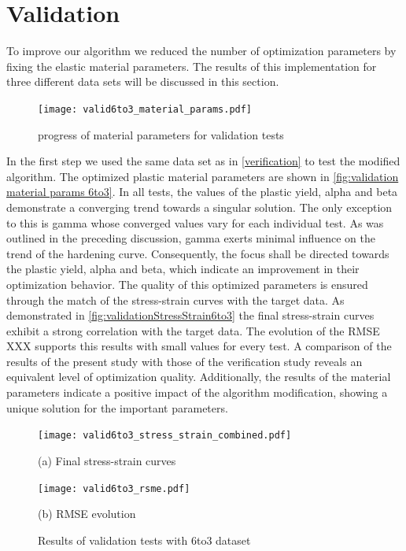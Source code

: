     
    \section{Validation}\label{sec: validation}
    To improve our algorithm we reduced the number of optimization parameters by fixing the elastic material parameters. The results of this implementation for three different data sets will be discussed in this section.

    \begin{figure}[H]
		\centering
        \texttt{[image: valid6to3\_material\_params.pdf]}
		\caption{progress of material parameters for validation tests}
		\label{fig:validation material params 6to3}
	\end{figure}

    In the first step we used the same data set as in \autoref{verification} to test the modified algorithm. The optimized plastic material parameters are shown in \autoref{fig:validation material params 6to3}.  In all tests, the values of the plastic yield, alpha and beta demonstrate a converging trend towards a singular solution. The only exception to this is gamma whose converged values vary for each individual test. As was outlined in the preceding discussion, gamma exerts minimal influence on the trend of the hardening curve. Consequently, the focus shall be directed towards the plastic yield, alpha and beta, which indicate an improvement in their optimization behavior.
    The quality of this optimized parameters is ensured through the match of the stress-strain curves with the target data. As demonstrated in \autoref{fig:validationStressStrain6to3} the final stress-strain curves exhibit a strong correlation with the target data. The evolution of the RMSE XXX supports this results with small values for every test. A comparison of the results of the present study with those of the verification study reveals an equivalent level of optimization quality. Additionally, the results of the material parameters indicate a positive impact of the algorithm modification, showing a unique solution for the important parameters. 
     
    
    \begin{figure}[H]
        \centering
        \begin{minipage}[t]{0.47\textwidth}
            \centering
            \texttt{[image: valid6to3\_stress\_strain\_combined.pdf]}
            \caption*{(a) Final stress-strain curves}
            \label{fig:validationStressStrain6to3}
        \end{minipage}
        \hfill
        \begin{minipage}[t]{0.47\textwidth}
            \centering
            \texttt{[image: valid6to3\_rsme.pdf]}
            \caption*{(b) RMSE evolution}
            \label{subfigure:validation-rmse-6to3}
        \end{minipage}
        \caption{Results of validation tests with 6to3 dataset}
        \label{fig:validation results 6to3}
    \end{figure}
    



